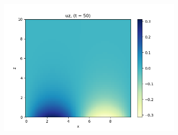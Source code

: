 \documentclass[11pt,
        usenames, %
        dvipsnames %
    ]{report}
\begin{document}
\begin{figure}[!h]
\begin{subfigure}{0.3\textwidth}
        \includegraphics[width=\textwidth]{plots/no_g_uz_t50.png}
    \end{subfigure}


\end{figure}
\end{document}
